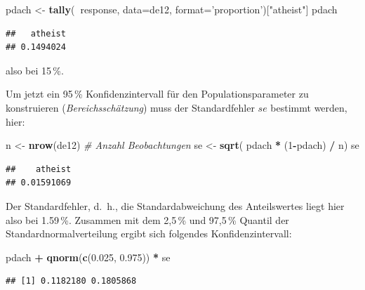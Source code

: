 \documentclass[12pt,ngerman,paper=a4,pagesize,DIV=13]{scrreprt}
\newenvironment{Shaded}{\begin{snugshade}}{\end{snugshade}}
\newcommand{\CommentTok}[1]{\textcolor[rgb]{0.56,0.35,0.01}{\textit{#1}}}
\newcommand{\DataTypeTok}[1]{\textcolor[rgb]{0.13,0.29,0.53}{#1}}
\newcommand{\DecValTok}[1]{\textcolor[rgb]{0.00,0.00,0.81}{#1}}
\newcommand{\FloatTok}[1]{\textcolor[rgb]{0.00,0.00,0.81}{#1}}
\newcommand{\KeywordTok}[1]{\textcolor[rgb]{0.13,0.29,0.53}{\textbf{#1}}}
\newcommand{\NormalTok}[1]{#1}
\newcommand{\OperatorTok}[1]{\textcolor[rgb]{0.81,0.36,0.00}{\textbf{#1}}}
\newcommand{\StringTok}[1]{\textcolor[rgb]{0.31,0.60,0.02}{#1}}
\begin{document}
\begin{Shaded}
\begin{Highlighting}[]
\NormalTok{pdach <-}\StringTok{ }\KeywordTok{tally}\NormalTok{(}\OperatorTok{~}\NormalTok{response, }\DataTypeTok{data=}\NormalTok{de12, }\DataTypeTok{format=}\StringTok{'proportion'}\NormalTok{)[}\StringTok{"atheist"}\NormalTok{]}
\NormalTok{pdach}
\end{Highlighting}
\end{Shaded}

\begin{verbatim}
##   atheist 
## 0.1494024
\end{verbatim}

also bei 15\(\,\)\%.

Um jetzt ein 95\(\,\)\% Konfidenzintervall für den Populationsparameter
zu konstruieren (\emph{Bereichsschätzung}) muss der Standardfehler
\(se\) bestimmt werden, hier:

\begin{Shaded}
\begin{Highlighting}[]
\NormalTok{n <-}\StringTok{ }\KeywordTok{nrow}\NormalTok{(de12) }\CommentTok{# Anzahl Beobachtungen}
\NormalTok{se <-}\StringTok{ }\KeywordTok{sqrt}\NormalTok{( pdach }\OperatorTok{*}\StringTok{ }\NormalTok{(}\DecValTok{1}\OperatorTok{-}\NormalTok{pdach) }\OperatorTok{/}\StringTok{ }\NormalTok{n)}
\NormalTok{se}
\end{Highlighting}
\end{Shaded}

\begin{verbatim}
##    atheist 
## 0.01591069
\end{verbatim}

Der Standardfehler, d.~h., die Standardabweichung des Anteilswertes
liegt hier also bei 1.59\(\,\)\%. Zusammen mit dem 2,5\(\,\)\% und
97,5\(\,\)\% Quantil der Standardnormalverteilung ergibt sich folgendes
Konfidenzintervall:

\begin{Shaded}
\begin{Highlighting}[]
\NormalTok{pdach }\OperatorTok{+}\StringTok{ }\KeywordTok{qnorm}\NormalTok{(}\KeywordTok{c}\NormalTok{(}\FloatTok{0.025}\NormalTok{, }\FloatTok{0.975}\NormalTok{)) }\OperatorTok{*}\StringTok{ }\NormalTok{se}
\end{Highlighting}
\end{Shaded}

\begin{verbatim}
## [1] 0.1182180 0.1805868
\end{verbatim}
\end{document}
